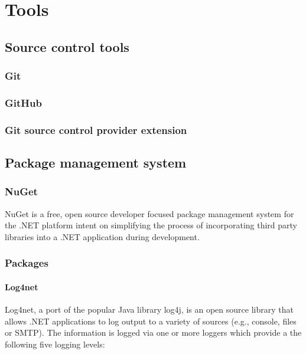 \chapter{Tools}\label{C:Tools}

\section{Source control tools}\label{S:Tools-control}
\subsection{Git}\label{SS:Tools-Git}
\subsection{GitHub}\label{SS:Tools-GitHub}
\subsection{Git source control provider extension}\label{SS:Tools-GitSource}

\section{Package management system}\label{S:Tools-pms}

\subsection{NuGet}\label{SS:Tools-NuGet}

NuGet is a free, open source developer focused package management system for the .NET platform intent on simplifying the process of incorporating third party libraries into a .NET application during development.

\subsection{Packages}\label{SS:Tools-packages}

\subsubsection{Log4net}\label{SSS:Tools-log4net}

Log4net, a port of the popular Java library log4j, is an open source library that allows .NET applications to log output to a variety of sources (e.g., console, files or SMTP). The information is logged via one or more loggers which provide a the following five logging levels: 

